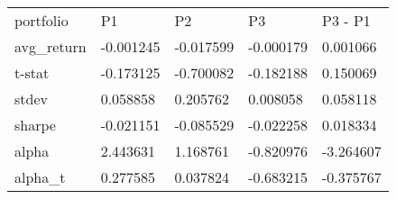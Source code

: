 \begin{tabular}{lllll}
\toprule
\midrule
portfolio & P1 & P2 & P3 & P3 - P1 \\
avg_return & -0.001245 & -0.017599 & -0.000179 & 0.001066 \\
t-stat & -0.173125 & -0.700082 & -0.182188 & 0.150069 \\
stdev & 0.058858 & 0.205762 & 0.008058 & 0.058118 \\
sharpe & -0.021151 & -0.085529 & -0.022258 & 0.018334 \\
alpha & 2.443631 & 1.168761 & -0.820976 & -3.264607 \\
alpha_t & 0.277585 & 0.037824 & -0.683215 & -0.375767 \\
\bottomrule
\end{tabular}
